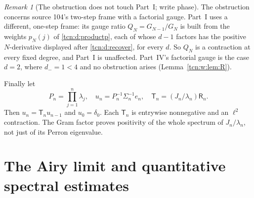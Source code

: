 \documentclass[11pt,letterpaper]{article}
\theoremstyle{remark}
\newtheorem{remark}[theorem]{Remark}
\begin{document}
\begin{remark}[The obstruction does not touch Part~I; write phase]\label{tcn:f:rem:naive}
The obstruction concerns source 104's two-step frame with a factorial gauge. Part~I uses a different, one-step frame: its gauge ratio $Q_N=G_{N-1}/G_N$ is built from the weights $p_N(j)$ of \eqref{tcn:d:productp}, each of whose $d-1$ factors has the positive $N$-derivative displayed after \eqref{tcn:d:recover}, for every $d$. So $Q_N$ is a contraction at every fixed degree, and Part~I is unaffected. Part~IV's factorial gauge is the case $d=2$, where $d_-=1<4$ and no obstruction arises (Lemma~\ref{tcn:w:lem:R}).
\end{remark}

Finally let
\begin{equation}\label{tcn:f:product}
 P_n=\prod_{j=1}^n\lambda_j,\quad
 u_n=P_n^{-1}\Sigma_n^{-1}e_n,\quad
 \mathsf T_n=(J_n/\lambda_n)\mathsf R_n.
\end{equation}
Then $u_n=\mathsf T_nu_{n-1}$ and $u_0=\delta_0$. Each $\mathsf T_n$ is entrywise nonnegative and an $\ell^2$ contraction. The Gram factor proves positivity of the whole spectrum of $J_n/\lambda_n$, not just of its Perron eigenvalue.

\section{The Airy limit and quantitative spectral estimates}\label{tcn:f:sec:spectral}
\end{document}
